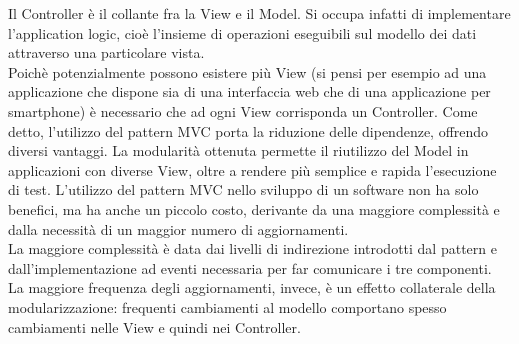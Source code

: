  Il Controller è il collante fra la View e il Model. Si occupa infatti di implementare l'application logic, cioè l'insieme di operazioni eseguibili sul modello dei dati attraverso una particolare vista.\\
 Poichè potenzialmente possono esistere più View (si pensi per esempio ad una applicazione che dispone sia di una interfaccia web che di una applicazione per smartphone) è necessario che ad ogni View corrisponda un Controller.
  Come detto, l'utilizzo del pattern MVC porta la riduzione delle dipendenze, offrendo diversi vantaggi. La modularità ottenuta permette il riutilizzo del Model in applicazioni con diverse View, oltre a rendere più semplice e rapida l'esecuzione di test. 
  L'utilizzo del pattern MVC nello sviluppo di un software non ha solo benefici, ma ha anche un piccolo costo, derivante da una maggiore complessità e dalla necessità di un maggior numero di aggiornamenti.\\
  La maggiore complessità è data dai livelli di indirezione introdotti dal pattern e dall'implementazione ad eventi necessaria per far comunicare i tre componenti. La maggiore frequenza degli aggiornamenti, invece, è un effetto collaterale della modularizzazione: frequenti cambiamenti al modello comportano spesso cambiamenti nelle View e quindi nei Controller.